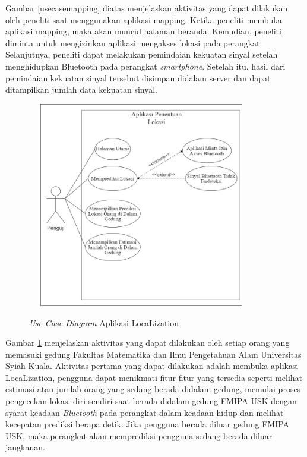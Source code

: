 
\par Gambar \ref{usecasemapping} diatas menjelaskan aktivitas yang dapat dilakukan oleh peneliti saat menggunakan aplikasi mapping. Ketika peneliti membuka aplikasi mapping, maka akan muncul halaman beranda. Kemudian, peneliti diminta untuk mengizinkan aplikasi mengakses lokasi pada perangkat. Selanjutnya, peneliti dapat melakukan pemindaian kekuatan sinyal setelah menghidupkan Bluetooth pada perangkat \textit{smartphone}. Setelah itu, hasil dari pemindaian kekuatan sinyal tersebut disimpan didalam server dan dapat ditampilkan jumlah data kekuatan sinyal.
\fancyhf{}
\fancyfoot[R]{\thepage}
\begin{figure}[H]
	\center
	\shadowbox
	{\includegraphics [width=10cm, height=9cm]{gambar/penentuanlokasi}}
	\caption{\textit{Use Case Diagram} Aplikasi LocaLization}
	\label{usecasedosen}
\end{figure}

\par Gambar \ref{usecasedosen} menjelaskan aktivitas yang dapat dilakukan oleh setiap orang yang memasuki gedung Fakultas Matematika dan Ilmu Pengetahuan Alam Universitas Syiah Kuala. Aktivitas pertama yang dapat dilakukan adalah membuka aplikasi LocaLization, pengguna dapat menikmati fitur-fitur yang tersedia seperti melihat estimasi atau jumlah orang yang sedang berada didalam gedung, memulai proses pengecekan lokasi diri sendiri saat berada didalam gedung FMIPA USK dengan syarat keadaan \textit{Bluetooth} pada perangkat dalam keadaan hidup dan melihat kecepatan prediksi berapa detik. Jika pengguna berada diluar gedung FMIPA USK, maka perangkat akan memprediksi pengguna sedang berada diluar jangkauan.

